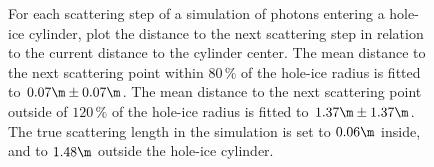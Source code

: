 \begin{figure}[htbp]
  \centering
  \hfill
  \hfill
  \caption{For each scattering step of a simulation of photons entering a hole-ice cylinder, plot the distance to the next scattering step in relation to the current distance to the cylinder center. The mean distance to the next scattering point within $80\,\%$ of the hole-ice radius is fitted to $0.07\m \pm 0.07\m$. The mean distance to the next scattering point outside of $120\,\%$ of the hole-ice radius is fitted to $1.37\m\pm 1.37\m$. The true scattering length in the simulation is set to $0.06\m$ inside, and to $1.48\m$ outside the hole-ice cylinder.}
  \label{fig:eeYoid2p}
\end{figure}

